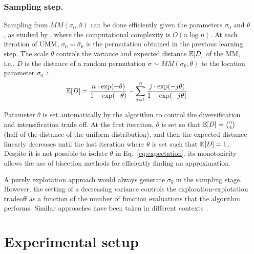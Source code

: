 \documentclass[runningheads]{llncs}
\begin{document}
\subsubsection{Sampling step.}\label{sec:sampling}
Sampling from $MM(\sigma_0,\theta)$  can be done efficiently given the parameters  $\sigma_0$ and $\theta$, as studied by \citet{IruCalLoz2016permallows}, where the computational complexity is $O(n\log n)$. %
%
At each iteration of UMM, $\sigma_0=\hat\sigma_0$ is the permutation obtained in the previous learning step. The scale $\theta$ controls the variance and expected distance $\mathbb{E}[D]$ of the MM, i.e., $D$ is the distance of a random permutation $\sigma\sim MM(\sigma_0, \theta)$ to the location parameter $\sigma_0$~\cite{gMallows}:
%
\begin{equation}\label{eq:expectation}
\mathbb{E}[D] = \frac{n \cdot \exp(-\theta)}{1-\exp(-\theta)} - \sum_{j=1}^{n}  \frac{j\cdot\exp(-j  \theta)}{1-\exp(-j\theta)}
\end{equation}

Parameter $\theta$ is set automatically by the algorithm to control the diversification and intensification trade off. At the first iteration, $\theta$ is set so that  $\mathbb{E}[D] = \binom{n}{4}$ (half of the distance of the uniform distribution), and then the expected distance linearly decreases until the last iteration where $\theta$ is set such that $\mathbb{E}[D] = 1$. Despite it is not possible to isolate $\theta$ in Eq.~\eqref{eq:expectation}, its monotonicity allows the use of bisection methods for efficiently finding an approximation. 

A purely explotation approach would always generate $\sigma_0$ in the sampling stage. However, the setting of a decreasing variance   controls the exploration-explotation tradeoff as a function of the number of function evaluations that the algorithm performs.  Similar approaches have been taken in different contexts~\cite{ArzCebPer2019qap}.





\section{Experimental setup}
\end{document}
